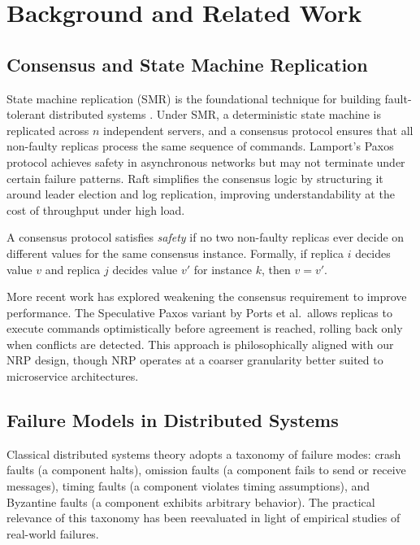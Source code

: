 \documentclass[12pt,letterpaper,oneside]{report}
\begin{document}
\chapter{Background and Related Work}
\label{ch:background}

\section{Consensus and State Machine Replication}

State machine replication (SMR) is the foundational technique for building fault-tolerant distributed systems \cite{schneider1990}. Under SMR, a deterministic state machine is replicated across $n$ independent servers, and a consensus protocol ensures that all non-faulty replicas process the same sequence of commands. Lamport's Paxos protocol \cite{lamport2001} achieves safety in asynchronous networks but may not terminate under certain failure patterns. Raft \cite{ongaro2014} simplifies the consensus logic by structuring it around leader election and log replication, improving understandability at the cost of throughput under high load.

\begin{defbox}[title=Consensus Safety]
A consensus protocol satisfies \textit{safety} if no two non-faulty replicas ever decide on different values for the same consensus instance. Formally, if replica $i$ decides value $v$ and replica $j$ decides value $v'$ for instance $k$, then $v = v'$.
\end{defbox}

More recent work has explored weakening the consensus requirement to improve performance. The Speculative Paxos variant by Ports et al.\ allows replicas to execute commands optimistically before agreement is reached, rolling back only when conflicts are detected. This approach is philosophically aligned with our NRP design, though NRP operates at a coarser granularity better suited to microservice architectures.

\section{Failure Models in Distributed Systems}

Classical distributed systems theory adopts a taxonomy of failure modes: crash faults (a component halts), omission faults (a component fails to send or receive messages), timing faults (a component violates timing assumptions), and Byzantine faults (a component exhibits arbitrary behavior). The practical relevance of this taxonomy has been reevaluated in light of empirical studies of real-world failures.
\end{document}
